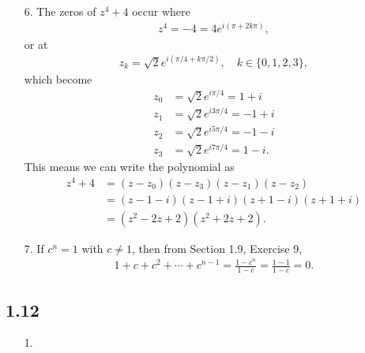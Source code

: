 \documentclass[a4paper,12pt]{article}
\begin{document}
\begin{enumerate}
    \item[6.]
        The zeros of $z^4 + 4$ occur where
        \begin{align*}
            z^4 = -4 = 4e^{i(\pi + 2k\pi)},
        \end{align*}
        or at
        \begin{align*}
            z_k = \sqrt{2} e^{i(\pi/4 + k\pi/2)}, \quad k \in \{ 0, 1, 2, 3 \},
        \end{align*}
        which become
        \begin{align*}
            z_0 &= \sqrt{2} e^{i \pi/4} = 1 + i \\
            z_1 &= \sqrt{2} e^{i 3\pi/4} = -1 + i \\
            z_2 &= \sqrt{2} e^{i 5\pi/4} = -1 - i \\
            z_3 &= \sqrt{2} e^{i 7\pi/4} = 1 - i.
        \end{align*}
        This means we can write the polynomial as
        \begin{align*}
            z^4 + 4 &= (z - z_0)(z - z_3)(z - z_1)(z - z_2) \\
            &= (z - 1 - i)(z - 1 + i)(z + 1 - i)(z + 1 + i) \\
            &= (z^2 - 2z + 2)(z^2 + 2z + 2).
        \end{align*}

    \item[7.]
        If $c^n = 1$ with $c \neq 1$, then from Section 1.9, Exercise 9,
        \begin{align*}
            1 + c + c^2 + \cdots + c^{n - 1} = \frac{1 - c^n}{1 - c} = \frac{1 - 1}{1 - c} = 0.
        \end{align*}
\end{enumerate}

\subsection*{1.12}
\begin{enumerate}
    \item[1.]
\end{enumerate}
\end{document}
